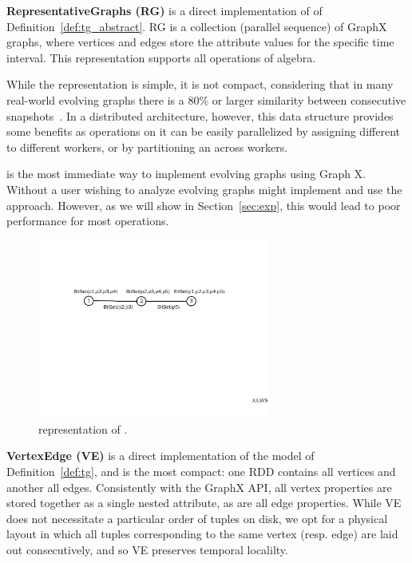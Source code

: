 {\bf RepresentativeGraphs (RG)} is a direct implementation of \trg of
Definition~\ref{def:tg_abstract}.  RG is a collection (parallel
sequence) of GraphX graphs, where vertices and edges store the
attribute values for the specific time interval.  This representation
supports all operations of \tg algebra.

While the \rg representation is simple, it is not compact, considering
that in many real-world evolving graphs there is a 80\% or larger
similarity between consecutive
snapshots~\cite{DBLP:journals/tos/MiaoHLWYZPCC15}.  In a distributed
architecture, however, this data structure provides some benefits as
operations on it can be easily parallelized by assigning different
\rgs to different workers, or by partitioning an \rg across workers.

\rg is the most immediate way to implement evolving graphs using Graph
X. Without \ql a user wishing to analyze evolving graphs might
implement and use the \rg approach.  However, as we will show in
Section~\ref{sec:exp}, this would lead to poor performance for most
operations.

\begin{figure}[t!]
\includegraphics[width=3in]{figs/ogc.pdf}
\caption{\og representation of .}
\label{fig:ogc}
\end{figure}

{\bf VertexEdge (VE)} is a direct implementation of the \tve model of
Definition~\ref{def:tg}, and is the most compact: one RDD contains
all vertices and another all edges.  Consistently with the GraphX API,
all vertex properties are stored together as a single nested
attribute, as are all edge properties.  While VE does not necessitate
a particular order of tuples on disk, we opt for a physical layout in
which all tuples corresponding to the same vertex (resp. edge) are
laid out consecutively, and so VE preserves temporal localilty.



